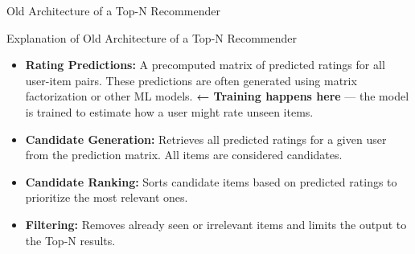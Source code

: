 \documentclass{beamer}
\begin{document}
\begin{frame}{Old Architecture of a Top-N Recommender}
\begin{center}
\end{center}
\end{frame}

\begin{frame}{Explanation of Old Architecture of a Top-N Recommender}
\begin{itemize}
    \item \textbf{Rating Predictions:}  
    A precomputed matrix of predicted ratings for all user-item pairs.  
    These predictions are often generated using matrix factorization or other ML models.  
    \textbf{← Training happens here} — the model is trained to estimate how a user might rate unseen items.

    \item \textbf{Candidate Generation:}  
    Retrieves all predicted ratings for a given user from the prediction matrix.  
    All items are considered candidates.

    \item \textbf{Candidate Ranking:}  
    Sorts candidate items based on predicted ratings to prioritize the most relevant ones.

    \item \textbf{Filtering:}  
    Removes already seen or irrelevant items and limits the output to the Top-N results.
\end{itemize}
\end{frame}
\end{document}
